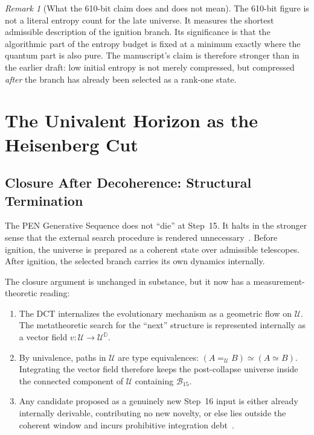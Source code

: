 \documentclass[11pt,a4paper]{article}
\theoremstyle{plain}
\theoremstyle{definition}
\theoremstyle{remark}
\newtheorem{remark}[theorem]{Remark}
\newcommand{\D}{\mathbb{D}}
\newcommand{\U}{\mathcal{U}}
\newcommand{\B}{\mathcal{B}}
\begin{document}
\begin{remark}[What the 610-bit claim does and does not mean]
\label{rem:entropy}
The 610-bit figure is not a literal entropy count for the late universe.
It measures the shortest admissible description of the ignition branch.
Its significance is that the algorithmic part of the entropy budget is fixed at a minimum exactly where the quantum part is also pure.
The manuscript's claim is therefore stronger than in the earlier draft: low initial entropy is not merely compressed, but compressed \emph{after} the branch has already been selected as a rank-one state.
\end{remark}


\section{The Univalent Horizon as the Heisenberg Cut}
\label{sec:firewall}

\subsection{Closure After Decoherence: Structural Termination}
\label{sec:termination}

The PEN Generative Sequence does not ``die'' at Step~15.
It halts in the stronger sense that the external search procedure is rendered unnecessary~\cite{pen}.
Before ignition, the universe is prepared as a coherent state over admissible telescopes.
After ignition, the selected branch carries its own dynamics internally.

The closure argument is unchanged in substance, but it now has a measurement-theoretic reading:
\begin{enumerate}[nosep]
    \item The DCT internalizes the evolutionary mechanism as a geometric flow on $\U$.
    The metatheoretic search for the ``next'' structure is represented internally as a vector field $v : \U \to \U^{\D}$.
    \item By univalence, paths in $\U$ are type equivalences: $(A =_{\U} B) \simeq (A \simeq B)$.
    Integrating the vector field therefore keeps the post-collapse universe inside the connected component of $\U$ containing $\B_{15}$.
    \item Any candidate proposed as a genuinely new Step~16 input is either already internally derivable, contributing no new novelty, or else lies outside the coherent window and incurs prohibitive integration debt~\cite{pen}.
\end{enumerate}
\end{document}
